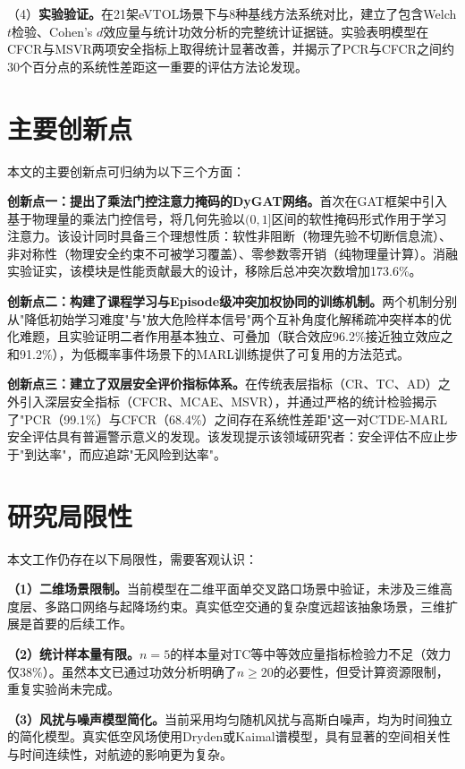 \documentclass[12pt,a4paper,UTF8]{ctexbook}
\begin{document}
（4）\textbf{实验验证。}在21架eVTOL场景下与8种基线方法系统对比，建立了包含Welch $t$检验、Cohen's $d$效应量与统计功效分析的完整统计证据链。实验表明模型在CFCR与MSVR两项安全指标上取得统计显著改善，并揭示了PCR与CFCR之间约30个百分点的系统性差距这一重要的评估方法论发现。

\section{主要创新点}

本文的主要创新点可归纳为以下三个方面：

\textbf{创新点一：提出了乘法门控注意力掩码的DyGAT网络。}首次在GAT框架中引入基于物理量的乘法门控信号，将几何先验以$(0,1]$区间的软性掩码形式作用于学习注意力。该设计同时具备三个理想性质：软性非阻断（物理先验不切断信息流）、非对称性（物理安全约束不可被学习覆盖）、零参数零开销（纯物理量计算）。消融实验证实，该模块是性能贡献最大的设计，移除后总冲突次数增加173.6\%。

\textbf{创新点二：构建了课程学习与Episode级冲突加权协同的训练机制。}两个机制分别从"降低初始学习难度"与"放大危险样本信号"两个互补角度化解稀疏冲突样本的优化难题，且实验证明二者作用基本独立、可叠加（联合效应96.2\%接近独立效应之和91.2\%），为低概率事件场景下的MARL训练提供了可复用的方法范式。

\textbf{创新点三：建立了双层安全评价指标体系。}在传统表层指标（CR、TC、AD）之外引入深层安全指标（CFCR、MCAE、MSVR），并通过严格的统计检验揭示了"PCR（99.1\%）与CFCR（68.4\%）之间存在系统性差距"这一对CTDE-MARL安全评估具有普遍警示意义的发现。该发现提示该领域研究者：安全评估不应止步于"到达率"，而应追踪"无风险到达率"。

\section{研究局限性}

本文工作仍存在以下局限性，需要客观认识：

\textbf{（1）二维场景限制。}当前模型在二维平面单交叉路口场景中验证，未涉及三维高度层、多路口网络与起降场约束。真实低空交通的复杂度远超该抽象场景，三维扩展是首要的后续工作。

\textbf{（2）统计样本量有限。}$n=5$的样本量对TC等中等效应量指标检验力不足（效力仅38\%）。虽然本文已通过功效分析明确了$n\geq20$的必要性，但受计算资源限制，重复实验尚未完成。

\textbf{（3）风扰与噪声模型简化。}当前采用均匀随机风扰与高斯白噪声，均为时间独立的简化模型。真实低空风场使用Dryden\cite{ref26}或Kaimal\cite{ref44}谱模型，具有显著的空间相关性与时间连续性，对航迹的影响更为复杂。
\end{document}

